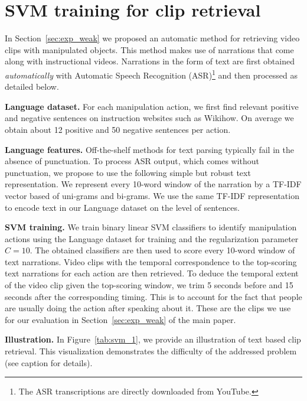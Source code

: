 \section{SVM training for clip retrieval}
\label{app:svm}

In Section~\ref{sec:exp_weak} we proposed an automatic method for retrieving video clips with manipulated objects.
This method makes use of narrations that come along with instructional videos. 
Narrations in the form of text are first obtained \emph{automatically} with Automatic Speech Recognition (ASR)\footnote{The ASR transcriptions are directly downloaded from YouTube.} and then processed as detailed below.

\textbf{Language dataset.}
For each manipulation action, we first find relevant positive and negative sentences on instruction websites such as Wikihow.
On average we obtain about 12 positive and 50 negative sentences per action.

\textbf{Language features.}
Off-the-shelf methods for text parsing typically fail in the absence of punctuation.
To process ASR output, which comes without punctuation, we propose to use the following simple but robust text representation. 
We represent every 10-word window of the narration by a TF-IDF vector based of uni-grams and bi-grams.
We use the same TF-IDF representation to encode text in our Language dataset on the level of sentences.

\textbf{SVM training.}
We train binary linear SVM classifiers to identify manipulation actions using the Language dataset for training and the regularization parameter $C=10$.
The obtained classifiers are then used to score every 10-word window of text narrations.
Video clips with the temporal correspondence to the top-scoring text narrations for each action are then retrieved. 
To deduce the temporal extent of the video clip given the top-scoring window, we trim 5 seconds before and 15 seconds after the corresponding timing.
This is to account for the fact that people are usually doing the action after speaking about it.
These are the clips we use for our evaluation in Section~\ref{sec:exp_weak} of the main paper.

\textbf{Illustration.} 
In Figure~\ref{tab:svm_1}, we provide an illustration of text based clip retrieval.
This visualization demonstrates the difficulty of the addressed problem (see caption for details).




